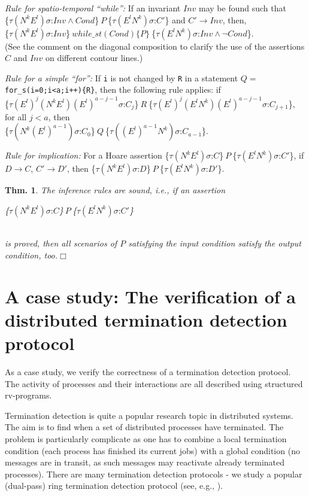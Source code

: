 \documentclass[runningheads]{llncs}
\newcommand{\1}{\u{a}}
\newcommand{\2}{\c{s}}
\newcommand{\5}{\c{t}}
\newcommand{\8}{\^{\i}}
\newcommand{\9}{\^{a}}
\newtheorem{theorem}{Theorem}[section]
\newtheorem{theorem}{Thm.}[section]
\newcommand{\bthm}{\begin{theorem}}
\newcommand{\ethm}{\end{theorem}}
\newcommand{\svsp}{\vspace{1ex}}
\newcommand{\ra}{\rightarrow}
\newcommand{\hass}[3]{\{$ #1 $\}{$\ #2\ $}\{$ #3 $\}}
\begin{document}
{\item {\em Rule for spatio-temporal ``while'':} If an invariant $Inv$ may be found such that\\ \hass{\tau
  (N^kE^l)\sigma\mbox{:} Inv\wedge Cond}{P}{\tau (E^lN^k)\sigma\mbox{:} C'} and $C'\ra Inv$,
  then,\\ \hass{\tau (N^kE^l)\sigma\mbox{:} Inv}{while\_st(Cond)\{P\}}{\tau (E^lN^k)\sigma\mbox{:} Inv\wedge
    \neg Cond}.\\ (See the comment on the diagonal composition to clarify the use of the assertions $C$ and
  $Inv$ on different contour lines.)

\item {\em Rule for a simple ``for'':} If {\tt i} is not changed by {\tt R} in a statement $Q=$ {\tt
for\_s(i=0;i<a;i++)\{R\}}, then the following rule applies: if\\ \hass{\tau
(E^l)^j(N^kE^l)(E^l)^{a-j-1}\sigma\mbox{:} C_j}{R}{\tau (E^l)^j(E^lN^k)(E^l)^{a-j-1}\sigma\mbox{:} C_{j+1}},\\
for all $j<a$, then\\ \hass{\tau (N^k(E^l)^{a-1})\sigma\mbox{:} C_0}{Q}{\tau ((E^l)^{a-1}N^k)\sigma\mbox{:}
C_{a-1}}.

\item {\em Rule for implication:} For a Hoare assertion \hass{\tau (N^kE^l)\sigma\mbox{:} C}{P}{\tau
(E^lN^k)\sigma\mbox{:} C'}, if $D\ra C$, $C'\ra D'$, then \hass{\tau (N^kE^l)\sigma\mbox{:} D}{P}{\tau
(E^lN^k)\sigma\mbox{:} D'}.\ed}

\bthm The inference rules are sound, i.e., if an assertion \svsp\\\centerline{\hass{\tau
    (N^kE^l)\sigma\mbox{:} C}{P}{\tau (E^lN^k)\sigma\mbox{:} C'}}\svsp\\ is proved, then all scenarios of $P$
satisfying the input condition satisfy the output condition, too.\hfill{$\Box$}\ethm

\section{A case study: The verification of a distributed termination detection protocol}\label{s-ring}

As a case study, we verify the correctness of a termination detection protocol. The activity of processes and
their interactions are all described using structured rv-programs.

Termination detection is quite a popular research topic in distributed systems. The aim is to find when a set
of distributed processes have terminated. The problem is particularly complicate as one has to combine a local
termination condition (each process has finished its current jobs) with a global condition (no messages are in
transit, as such messages may reactivate already terminated processes). There are many termination detection
protocols - we study a popular (dual-pass) ring termination detection protocol (see, e.g., \cite{dij87}).
\end{document}
